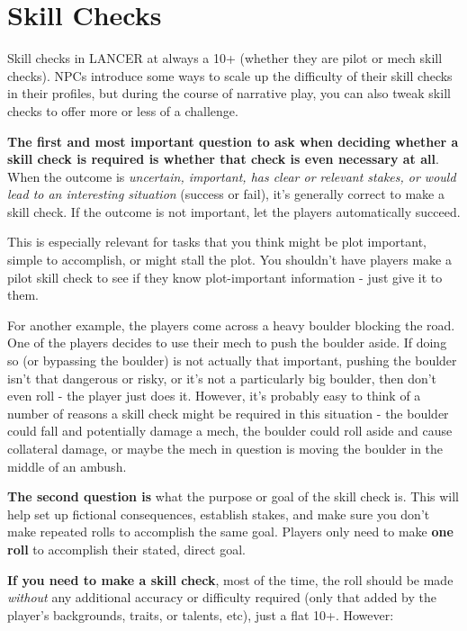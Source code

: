 \section{Skill Checks}

Skill checks in LANCER at always a 10+ (whether they are pilot or mech skill checks). NPCs
introduce some ways to scale up the difficulty of their skill checks in their profiles, but during the
course of narrative play, you can also tweak skill checks to offer more or less of a challenge.

\textbf{The first and most important question to ask when deciding whether a skill check is
required is whether that check is even necessary at all}. When the outcome is \textit{uncertain,
important, has clear or relevant stakes, or would lead to an interesting situation} (success or fail),
it's generally correct to make a skill check. If the outcome is not important, let the players
automatically succeed.

This is especially relevant for tasks that you think might be plot important, simple to accomplish,
or might stall the plot. You shouldn't have players make a pilot skill check to see if they know
plot-important information - just give it to them.

For another example, the players come across a heavy boulder blocking the road. One of the
players decides to use their mech to push the boulder aside. If doing so (or bypassing the
boulder) is not actually that important, pushing the boulder isn't that dangerous or risky, or it's
not a particularly big boulder, then don't even roll - the player just does it. However, it's probably
easy to think of a number of reasons a skill check might be required in this situation - the boulder
could fall and potentially damage a mech, the boulder could roll aside and cause collateral
damage, or maybe the mech in question is moving the boulder in the middle of an ambush.

\textbf{The second question is} what the purpose or goal of the skill check is. This will help set up
fictional consequences, establish stakes, and make sure you don't make repeated rolls to
accomplish the same goal. Players only need to make \textbf{one roll} to accomplish their stated, direct
goal.

\textbf{If you need to make a skill check}, most of the time, the roll should be made \textit{without} any
additional accuracy or difficulty required (only that added by the player's backgrounds, traits, or
talents, etc), just a flat 10+. However:

